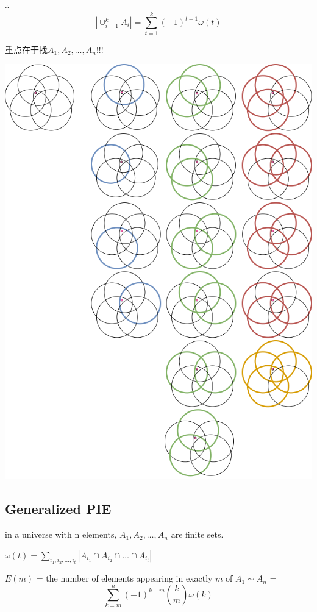 \documentclass[12pt,a4paper]{ctexrep}
\begin{document}
$\therefore$ \[|\cup_{i=1}^{k} A_{i}| = \sum_{t=1}^{k} (-1)^{t+1} \omega(t)\]

重点在于找$A_{1},A_{2},\dots,A_{n}$!!!\\

\begin{center}
\includegraphics[scale=0.3]{PIE.png}
\end{center}

\subsection{Generalized PIE}
in a universe with n elements, $A_{1}, A_{2}, \dots , A_{n}$ are finite sets.

$\omega(t) = \sum_{i_{1},i_{2},\dots,i_{t}}|A_{i_{1}} \cap A_{i_{2}} \cap \dots \cap A_{i_{t}}|$

$E(m)$ = the number of elements appearing in exactly $m$ of $A_{1} \sim A_{n}$ = \[\sum_{k=m}^{n} (-1)^{k-m} \binom{k}{m} \omega(k)\]
\end{document}
